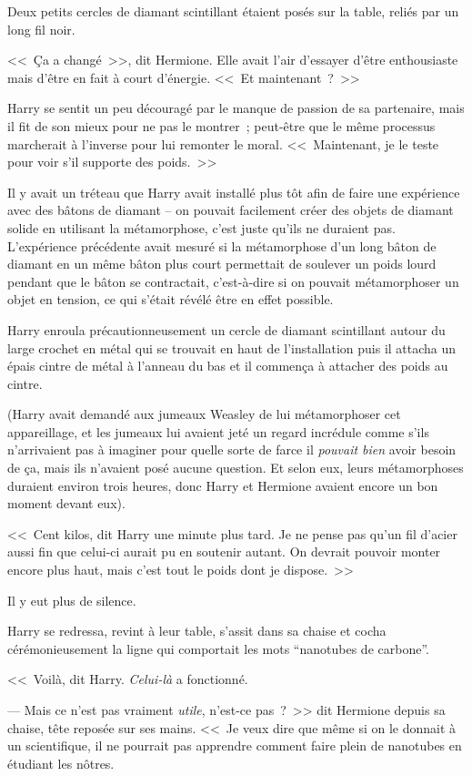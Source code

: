 Deux petits cercles de diamant scintillant étaient posés sur la table, reliés par un long fil noir.

<<~Ça a changé~>>, dit Hermione. Elle avait l'air d'essayer d'être enthousiaste mais d'être en fait à court d'énergie. <<~Et maintenant~?~>>

Harry se sentit un peu découragé par le manque de passion de sa partenaire, mais il fit de son mieux pour ne pas le montrer~; peut-être que le même processus marcherait à l'inverse pour lui remonter le moral. <<~Maintenant, je le teste pour voir s'il supporte des poids.~>>

Il y avait un tréteau que Harry avait installé plus tôt afin de faire une expérience avec des bâtons de diamant -- on pouvait facilement créer des objets de diamant solide en utilisant la métamorphose, c'est juste qu'ils ne duraient pas. L'expérience précédente avait mesuré si la métamorphose d'un long bâton de diamant en un même bâton plus court permettait de soulever un poids lourd pendant que le bâton se contractait, c'est-à-dire si on pouvait métamorphoser un objet en tension, ce qui s'était révélé être en effet possible.

Harry enroula précautionneusement un cercle de diamant scintillant autour du large crochet en métal qui se trouvait en haut de l'installation puis il attacha un épais cintre de métal à l'anneau du bas et il commença à attacher des poids au cintre.

(Harry avait demandé aux jumeaux Weasley de lui métamorphoser cet appareillage, et les jumeaux lui avaient jeté un regard incrédule comme s'ils n'arrivaient pas à imaginer pour quelle sorte de farce il \emph{pouvait bien} avoir besoin de ça, mais ils n'avaient posé aucune question. Et selon eux, leurs métamorphoses duraient environ trois heures, donc Harry et Hermione avaient encore un bon moment devant eux).

<<~Cent kilos, dit Harry une minute plus tard. Je ne pense pas qu'un fil d'acier aussi fin que celui-ci aurait pu en soutenir autant. On devrait pouvoir monter encore plus haut, mais c'est tout le poids dont je dispose.~>>

Il y eut plus de silence.

Harry se redressa, revint à leur table, s'assit dans sa chaise et cocha cérémonieusement la ligne qui comportait les mots “nanotubes de carbone”.

<<~Voilà, dit Harry. \emph{Celui-là} a fonctionné.

--- Mais ce n'est pas vraiment \emph{utile}, n'est-ce pas~?~>> dit Hermione depuis sa chaise, tête reposée sur ses mains. <<~Je veux dire que même si on le donnait à un scientifique, il ne pourrait pas apprendre comment faire plein de nanotubes en étudiant les nôtres.

